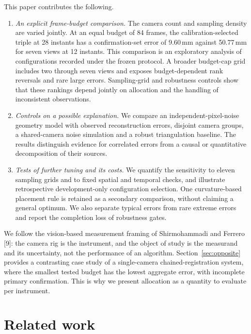 \documentclass{iopjournal}
\begin{document}
This paper contributes the following.

\begin{enumerate}
\item \textit{An explicit frame-budget comparison.} The camera count and
sampling density are varied jointly. At an equal budget of 84 frames, the
calibration-selected triple at 28 instants has a confirmation-set error of
9.60\,mm against 50.77\,mm for seven views at 12 instants. This comparison is
an exploratory analysis of configurations recorded under the frozen protocol.
A broader budget-cap grid includes two through seven views and exposes
budget-dependent rank reversals and rare large errors. Sampling-grid and
robustness controls show that these rankings depend jointly on allocation
and the handling of inconsistent observations.

\item \textit{Controls on a possible explanation.} We compare an
independent-pixel-noise geometry model with observed reconstruction errors,
disjoint camera groups, a shared-camera noise simulation and a robust
triangulation baseline. The results distinguish evidence for correlated
errors from a causal or quantitative decomposition of their sources.

\item \textit{Tests of further tuning and its costs.} We quantify the
sensitivity to eleven sampling grids and to fixed spatial and temporal
checks, and illustrate retrospective development-only configuration selection.
One curvature-based placement rule is retained as a secondary comparison,
without claiming a general optimum. We also separate typical errors
from rare extreme errors and report the completion loss of robustness gates.

\end{enumerate}

We follow the vision-based measurement framing of Shirmohammadi and Ferrero
[9]: the camera rig is the instrument, and the object of study is the
measurand and its uncertainty, not the performance of an algorithm.
Section~\ref{sec:opposite} provides a contrasting case study of a
single-camera chained-registration system, where the smallest tested budget
has the lowest aggregate error, with incomplete primary confirmation. This is why
we present allocation as a quantity to evaluate per instrument.

\section{Related work}
\label{sec:related}
\end{document}
